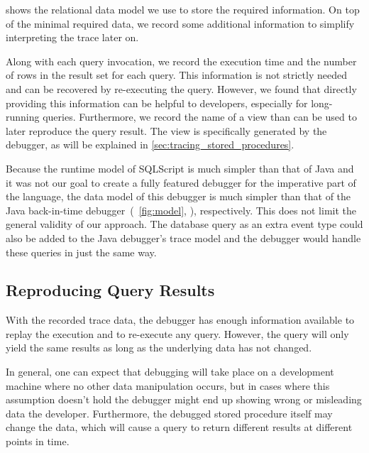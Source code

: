  shows the relational data model we use to store the required information.
On top of the minimal required data, we record some additional information to simplify interpreting the trace later on.

Along with each query invocation, 
we record the execution time and the number of rows in the result set for each query.
This information is not strictly needed and can be recovered by re-executing the query.
However, we found that directly providing this information can be helpful to developers, especially for long-running queries.
Furthermore, we record the name of a view than can be used to later reproduce the query result.
The view is specifically generated by the debugger, as will be explained in \cref{sec:tracing_stored_procedures}.

Because the runtime model of SQLScript is much simpler than that of Java and it was not our goal to create a fully featured debugger for the imperative part of the language, the data model of this debugger is much simpler than that of the Java back-in-time debugger~(\cf~\cref{fig:model}, ), respectively.
This does not limit the general validity of our approach.
The database query as an extra event type could also be added to the Java debugger's trace model and the debugger would handle these queries in just the same way.

\subsection{Reproducing Query Results}

\tmpStart
With the recorded trace data, the debugger has enough information available to replay the execution and to re-execute any query.
However, the query will only yield the same results as long as the underlying data has not changed.

In general, one can expect that debugging will take place on a development machine where no other data manipulation occurs, 
but in cases where this assumption doesn't hold the debugger might end up showing wrong or misleading data the developer.
Furthermore, the debugged stored procedure itself may change the data, which will cause a query to return different results at different points in time.
\tmpEnd

